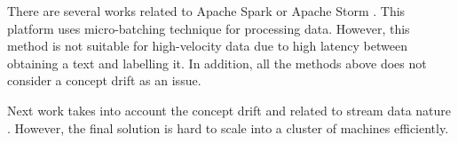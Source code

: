 

There are several works related to Apache Spark \cite{semberecki2016distributed} \cite{8029336} \cite{Nodarakis2016LargeSS} \cite{baltas2016apache} \cite{svyatkovskiy2016large} or Apache Storm \cite{khumoyun2016real}. This platform uses micro-batching technique for processing data. However, this method is not suitable for high-velocity data due to high latency between obtaining a text and labelling it. In addition, all the methods above does not consider a concept drift as an issue.

Next work takes into account the concept drift and related to stream data nature \cite{zhang2008one}. However, the final solution is hard to scale into a cluster of machines efficiently.